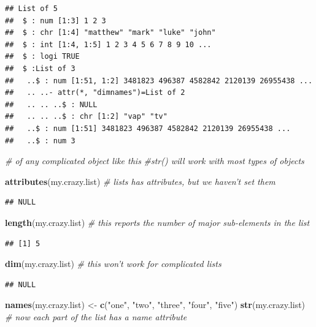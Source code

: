\documentclass[]{article}
\newenvironment{Shaded}{\begin{snugshade}}{\end{snugshade}}
\newcommand{\KeywordTok}[1]{\textcolor[rgb]{0.13,0.29,0.53}{\textbf{#1}}}
\newcommand{\StringTok}[1]{\textcolor[rgb]{0.31,0.60,0.02}{#1}}
\newcommand{\CommentTok}[1]{\textcolor[rgb]{0.56,0.35,0.01}{\textit{#1}}}
\newcommand{\NormalTok}[1]{#1}
\begin{document}
\begin{verbatim}
## List of 5
##  $ : num [1:3] 1 2 3
##  $ : chr [1:4] "matthew" "mark" "luke" "john"
##  $ : int [1:4, 1:5] 1 2 3 4 5 6 7 8 9 10 ...
##  $ : logi TRUE
##  $ :List of 3
##   ..$ : num [1:51, 1:2] 3481823 496387 4582842 2120139 26955438 ...
##   .. ..- attr(*, "dimnames")=List of 2
##   .. .. ..$ : NULL
##   .. .. ..$ : chr [1:2] "vap" "tv"
##   ..$ : num [1:51] 3481823 496387 4582842 2120139 26955438 ...
##   ..$ : num 3
\end{verbatim}

\begin{Shaded}
\begin{Highlighting}[]
\CommentTok{# of any complicated object like this}
\CommentTok{#str() will work with most types of objects}

\KeywordTok{attributes}\NormalTok{(my.crazy.list) }\CommentTok{# lists has attributes, but we haven't set them}
\end{Highlighting}
\end{Shaded}

\begin{verbatim}
## NULL
\end{verbatim}

\begin{Shaded}
\begin{Highlighting}[]
\KeywordTok{length}\NormalTok{(my.crazy.list) }\CommentTok{# this reports the number of major sub-elements in the list}
\end{Highlighting}
\end{Shaded}

\begin{verbatim}
## [1] 5
\end{verbatim}

\begin{Shaded}
\begin{Highlighting}[]
\KeywordTok{dim}\NormalTok{(my.crazy.list) }\CommentTok{# this won't work for complicated lists}
\end{Highlighting}
\end{Shaded}

\begin{verbatim}
## NULL
\end{verbatim}

\begin{Shaded}
\begin{Highlighting}[]
\KeywordTok{names}\NormalTok{(my.crazy.list) <-}\StringTok{ }\KeywordTok{c}\NormalTok{(}\StringTok{"one"}\NormalTok{, }\StringTok{"two"}\NormalTok{, }\StringTok{"three"}\NormalTok{, }\StringTok{"four"}\NormalTok{, }\StringTok{"five"}\NormalTok{)}
\KeywordTok{str}\NormalTok{(my.crazy.list) }\CommentTok{# now each part of the list has a name attribute}
\end{Highlighting}
\end{Shaded}
\end{document}

